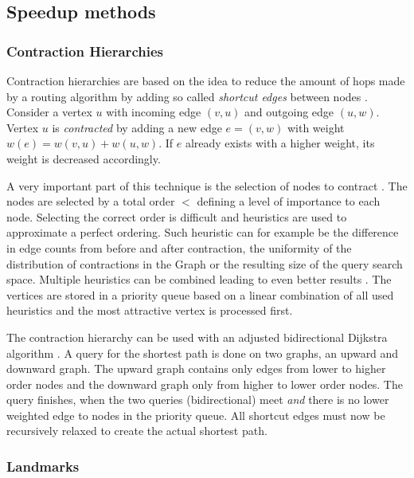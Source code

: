 	\subsection{Speedup methods}
	\label{subsec:speedup-methods}
		
		\subsubsection{Contraction Hierarchies}
		\label{subsubsec:ch}
		
			Contraction hierarchies are based on the idea to reduce the amount of hops made by a routing algorithm by adding so called \emph{shortcut edges} between nodes \cite{geisberger-contraction-hierarchies}.
			Consider a vertex $u$ with incoming edge $(v, u)$ and outgoing edge $(u, w)$.
			Vertex $u$ is \emph{contracted} by adding a new edge $e = (v, w)$ with weight $w(e) = w(v, u) + w(u, w)$.
			If $e$ already exists with a higher weight, its weight is decreased accordingly.
			
			A very important part of this technique is the selection of nodes to contract \cite[14]{geisberger-contraction-hierarchies}.
			The nodes are selected by a total order $<$ defining a level of importance to each node.
			Selecting the correct order is difficult and heuristics are used to approximate a perfect ordering.
			Such heuristic can for example be the difference in edge counts from before and after contraction, the uniformity of the distribution of contractions in the Graph or the resulting size of the query search space.
			Multiple heuristics can be combined leading to even better results \cite[49]{geisberger-contraction-hierarchies}.
			The vertices are stored in a priority queue based on a linear combination of all used heuristics and the most attractive vertex is processed first.
			
			The contraction hierarchy can be used with an adjusted bidirectional Dijkstra algorithm \cite[29-30]{geisberger-contraction-hierarchies}.
			A query for the shortest path is done on two graphs, an upward and downward graph.
			The upward graph contains only edges from lower to higher order nodes and the downward graph only from higher to lower order nodes.
			The query finishes, when the two queries (bidirectional) meet \emph{and} there is no lower weighted edge to nodes in the priority queue.
			All shortcut edges must now be recursively relaxed to create the actual shortest path.
		
		\subsubsection{Landmarks}
		
